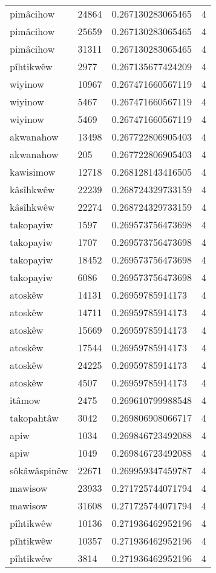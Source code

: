 \begin{longtable}{llll}
pimâcihow & 24864 & 0.267130283065465 & 4 \\
pimâcihow & 25659 & 0.267130283065465 & 4 \\
pimâcihow & 31311 & 0.267130283065465 & 4 \\
pîhtikwêw & 2977 & 0.267135677424209 & 4 \\
wiyinow & 10967 & 0.267471660567119 & 4 \\
wiyinow & 5467 & 0.267471660567119 & 4 \\
wiyinow & 5469 & 0.267471660567119 & 4 \\
akwanahow & 13498 & 0.267722806905403 & 4 \\
akwanahow & 205 & 0.267722806905403 & 4 \\
kawisimow & 12718 & 0.268128143416505 & 4 \\
kâsîhkwêw & 22239 & 0.268724329733159 & 4 \\
kâsîhkwêw & 22274 & 0.268724329733159 & 4 \\
takopayiw & 1597 & 0.269573756473698 & 4 \\
takopayiw & 1707 & 0.269573756473698 & 4 \\
takopayiw & 18452 & 0.269573756473698 & 4 \\
takopayiw & 6086 & 0.269573756473698 & 4 \\
atoskêw & 14131 & 0.26959785914173 & 4 \\
atoskêw & 14711 & 0.26959785914173 & 4 \\
atoskêw & 15669 & 0.26959785914173 & 4 \\
atoskêw & 17544 & 0.26959785914173 & 4 \\
atoskêw & 24225 & 0.26959785914173 & 4 \\
atoskêw & 4507 & 0.26959785914173 & 4 \\
itâmow & 2475 & 0.269610799988548 & 4 \\
takopahtâw & 3042 & 0.269806908066717 & 4 \\
apiw & 1034 & 0.269846723492088 & 4 \\
apiw & 1049 & 0.269846723492088 & 4 \\
sôkâwâspinêw & 22671 & 0.269959347459787 & 4 \\
mawisow & 23933 & 0.271725744071794 & 4 \\
mawisow & 31608 & 0.271725744071794 & 4 \\
pîhtikwêw & 10136 & 0.271936462952196 & 4 \\
pîhtikwêw & 10357 & 0.271936462952196 & 4 \\
pîhtikwêw & 3814 & 0.271936462952196 & 4 \\

\end{longtable}
